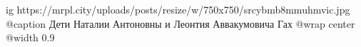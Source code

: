  
 
 
 
 

\ifcmt
  ig https://mrpl.city/uploads/posts/resize/w/750x750/srcybmb8mmuhmvic.jpg
	@caption Дети Наталии Антоновны и Леонтия Аввакумовича Гах
  @wrap center
  @width 0.9
\fi
